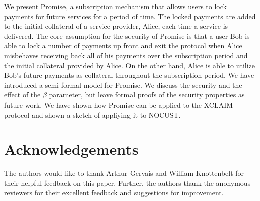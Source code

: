 \documentclass[runningheads]{llncs}
\newcommand{\sys}{Promise\xspace}
\begin{document}
We present \sys, a subscription mechanism that allows users to lock payments for future services for a period of time.
The locked payments are added to the initial collateral of a service provider, Alice, each time a service is delivered.
The core assumption for the security of \sys is that a user Bob is able to lock a number of payments up front and exit the protocol when Alice misbehaves receiving back all of his payments over the subscription period and the initial collateral provided by Alice.
On the other hand, Alice is able to utilize Bob's future payments as collateral throughout the subscription period.
We have introduced a semi-formal model for \sys.
We discuss the security and the effect of the $\beta$ parameter, but leave formal proofs of the security properties as future work.
We have shown how \sys can be applied to the XCLAIM protocol and shown a sketch of appliying it to NOCUST.

\section*{Acknowledgements}
The authors would like to thank Arthur Gervais and William Knottenbelt for their helpful feedback on this paper. Further, the authors thank the anonymous reviewers for their excellent feedback and suggestions for improvement.






\end{document}
